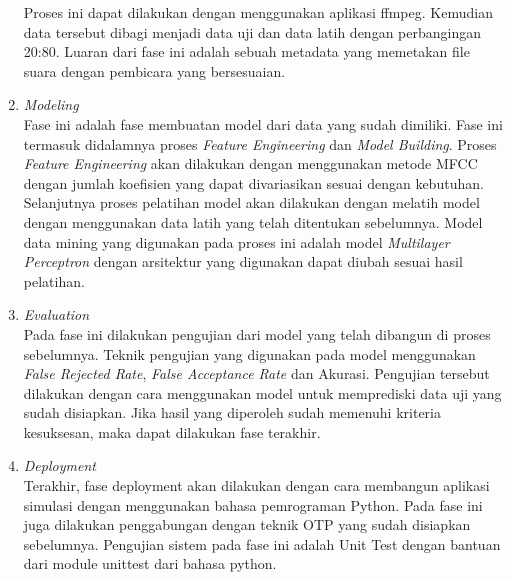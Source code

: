 \begin{enumerate}
	Proses ini dapat dilakukan dengan menggunakan aplikasi ffmpeg. Kemudian data tersebut dibagi menjadi data uji dan data latih dengan perbangingan 20:80. Luaran dari fase ini adalah sebuah metadata yang memetakan file suara dengan pembicara yang bersesuaian. 
	
	\item \textit{Modeling}\\
	Fase ini adalah fase membuatan model dari data yang sudah dimiliki. Fase ini termasuk didalamnya proses \textit{Feature Engineering} dan \textit{Model Building}.
	Proses \textit{Feature Engineering} akan dilakukan dengan menggunakan metode MFCC dengan jumlah koefisien yang dapat divariasikan sesuai dengan kebutuhan. Selanjutnya proses pelatihan model akan dilakukan dengan melatih model dengan menggunakan data latih yang telah ditentukan sebelumnya. Model data mining yang digunakan pada proses ini adalah model \textit{Multilayer Perceptron} dengan arsitektur yang digunakan dapat diubah sesuai hasil pelatihan.
	
	\item \textit{Evaluation}\\
	Pada fase ini dilakukan pengujian dari model yang telah dibangun di proses sebelumnya. Teknik pengujian yang digunakan pada model menggunakan \textit{False Rejected Rate}, \textit{False Acceptance Rate} dan Akurasi. Pengujian tersebut dilakukan dengan cara menggunakan model untuk memprediski data uji yang sudah disiapkan. Jika hasil yang diperoleh sudah memenuhi kriteria kesuksesan, maka dapat dilakukan fase terakhir.
	
	\item \textit{Deployment}\\
	Terakhir, fase deployment akan dilakukan dengan cara membangun aplikasi simulasi dengan menggunakan bahasa pemrograman Python. Pada fase ini juga dilakukan penggabungan dengan teknik OTP yang sudah disiapkan sebelumnya. Pengujian sistem pada fase ini adalah Unit Test dengan bantuan dari module unittest dari bahasa python.
\end{enumerate}

